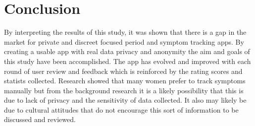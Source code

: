 \section{Conclusion}\label{conc}

By interpreting the results of this study, it was shown that there is a gap in the market for private and discreet focused period and symptom tracking apps. By creating a usable app with real data privacy and anonymity the aim and goals of this study have been accomplished. The app has evolved and improved with each round of user review and feedback which is reinforced by the rating scores and statists collected. Research showed that many women prefer to track symptoms manually but from the background research it is a likely possibility that this is due to lack of privacy and the sensitivity of data collected. It also may likely be due to cultural attitudes that do not encourage this sort of information to be discussed and reviewed.
